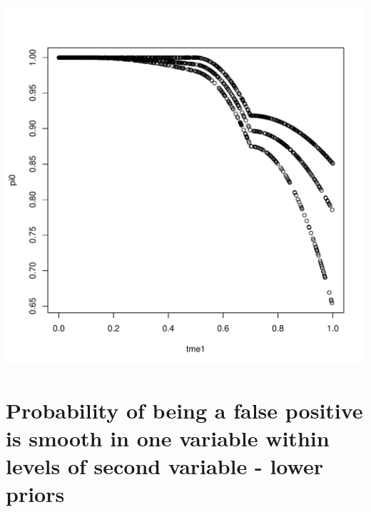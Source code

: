 \documentclass{article}\usepackage[]{graphicx}\usepackage[]{color}
\makeatletter
\def\maxwidth{ %
  \ifdim\Gin@nat@width>\linewidth
    \linewidth
  \else
    \Gin@nat@width
  \fi
}
\newenvironment{knitrout}{}{} %
\makeatother
\begin{document}
\begin{knitrout}
{\centering \includegraphics[width=\maxwidth]{Figures/III-1} 

}



\end{knitrout}

\section{Probability of being a false positive is smooth in one variable within levels of second variable - lower priors}
\end{document}

